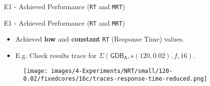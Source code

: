 \begin{frame}{E1 - Achieved Performance (\texttt{RT} and \texttt{MRT})}
\hspace{0.1cm}
\begin{minipage}{0.48\textwidth}
\end{minipage}
\end{frame}

\begin{frame}{E1 - Achieved Performance (\texttt{RT} and \texttt{MRT})}

\begin{itemize}
    \item Achieved \textbf{low} and \textbf{constant} \texttt{RT} (Response Time) values.
    \item E.g. Check results trace for $\Sigma(\mathsf{GDB_A}, s(120, 0.02), f, 16)$.
\end{itemize}
\begin{figure}
    \centering
    \texttt{[image: images/4-Experiments/NRT/small/120-0.02/fixedcores/16c/traces-response-time-reduced.png]}
\end{figure}
\end{frame}

